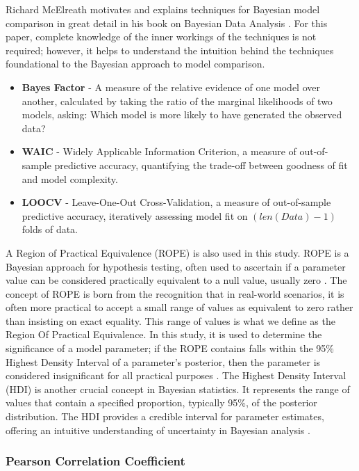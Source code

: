 Richard McElreath motivates and explains techniques for Bayesian model
comparison in great detail in his book on Bayesian Data Analysis
\cite{statrethinking}. For this paper, complete knowledge of the inner workings
of the techniques is not required; however, it helps to understand the intuition
behind the techniques foundational to the Bayesian approach to model
comparison.

\begin{itemize}
  \item \textbf{Bayes Factor} - A measure of the relative evidence of one model
    over another, calculated by taking the ratio of the marginal likelihoods of
    two models, asking: Which model is more likely to have generated the
    observed data?
  \item \textbf{WAIC} - Widely Applicable Information Criterion, a measure of
    out-of-sample predictive accuracy, quantifying the trade-off between
    goodness  of fit and model complexity.
  \item \textbf{LOOCV} - Leave-One-Out Cross-Validation, a measure of
    out-of-sample predictive accuracy, iteratively assessing model fit on
    $(len(Data) - 1)$ folds of data.
\end{itemize}

A Region of Practical Equivalence (ROPE) is also used in this study. ROPE is a
Bayesian approach for hypothesis testing, often used to ascertain if a
parameter value can be considered practically equivalent to a null value,
usually zero \cite{puppies}. The concept of ROPE is born from the recognition
that in real-world scenarios, it is often more practical to accept a small
range of values as equivalent to zero rather than insisting on exact equality.
This range of values is what we define as the Region Of Practical Equivalence.
In this study, it is used to determine the significance of a model parameter;
if the ROPE contains falls within the 95\% Highest Density Interval of a
parameter's posterior, then the parameter is considered insignificant for all
practical purposes \cite{puppies}.
The Highest Density Interval (HDI) is another crucial concept in Bayesian
statistics. It represents the range of values that contain a specified
proportion, typically 95\%, of the posterior distribution. The HDI provides a
credible interval for parameter estimates, offering an intuitive understanding
of uncertainty in Bayesian analysis \cite{statrethinking}.

\subsubsection{Pearson Correlation Coefficient}

